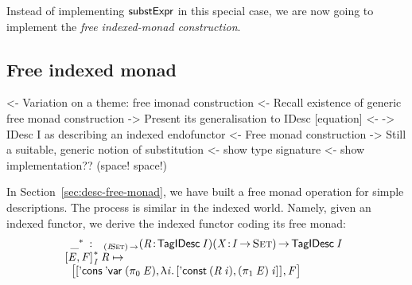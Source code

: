 Instead of implementing $\substH$ in this special case, we are now
going to implement the \emph{free indexed-monad construction}.

\subsection{Free indexed monad}

\begin{wstructure}
<- Variation on a theme: free imonad construction
    <- Recall existence of generic free monad construction
    -> Present its generalisation to IDesc [equation]
        <- \I -> IDesc I as describing an indexed endofunctor
        <- Free monad construction
    -> Still a suitable, generic notion of substitution
        <- show type signature
        <- show implementation?? (space! space!)
\end{wstructure}

In Section~\ref{sec:desc-free-monad}, we have built a free monad
operation for simple descriptions. The process is similar in the
indexed world. Namely, given an indexed functor, we derive the indexed
functor coding its free monad: 
%
\[\stk{
\begin{array}{ll}
\FreeIMonad{\_}{} : & _{\PI{\V{I}}{\Set}}
                     \PITEL{\V{R}}{\TagIDesc{\V{I}}} 
                     \PITEL{\V{X}}{\V{I} \To \Set}\To 
                      \TagIDesc{\V{I}}
\end{array} \\
\FreeIMonad{\pair{\V{E}}{\V{F}}{}}{\V{I}}{\V{R}} \mapsto \\ \;\;
    \pair{\pair{\ListCons{\DVar{\!}}{(\fst{\V{E}})}} 
               {\LAM{\V{i}}
                \pair{\DConst{(\V{R}\: \V{i})}}
                     {(\snd{\V{E}})\: \V{i}}{}}{}}
         {\V{F}}{}
}\]


\newcommand{\substI}{\F{substI}}


